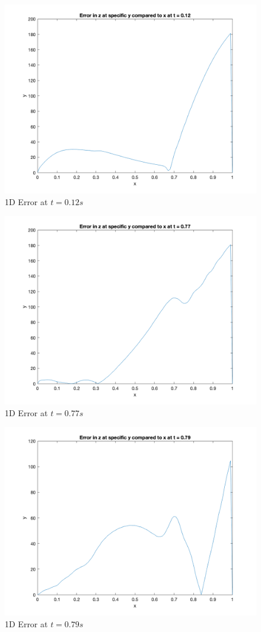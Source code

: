 \documentclass[conf]{new-aiaa}
\begin{document}
\begin{figure}[H]
    \begin{center}
    \includegraphics [width= .7\linewidth]{figures/error_at_specific_y_t012.png}
    \caption{1D Error at $t=0.12s$}
    \label{fig_1d12}
    \end{center}
\end{figure}

\begin{figure}[H]
    \begin{center}
    \includegraphics [width= .7\linewidth]{figures/error_at_specific_y_t077.png}
    \caption{1D Error at $t=0.77s$}
    \label{fig_1d77}
    \end{center}
\end{figure}

\begin{figure}[H]
    \begin{center}
    \includegraphics [width= .7 \linewidth]{figures/error_at_specific_y_t079.png}
    \caption{1D Error at $t=0.79s$}
    \label{fig_1d79}
    \end{center}
\end{figure}
\end{document}
